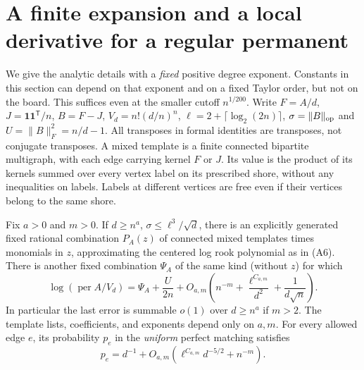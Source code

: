 \section{A finite expansion and a local derivative for a regular permanent}
\label{an:appendix}
We give the analytic details with a \emph{fixed} positive degree exponent. Constants in this section can depend on that exponent and on a fixed Taylor order, but not on the board. This suffices even at the smaller cutoff $n^{1/200}$. Write $F=A/d$, $J=\mathbf 1\mathbf 1^{\mathsf T}/n$, $B=F-J$, $V_d=n!(d/n)^n$, $\ell=2+\lceil\log_2(2n)\rceil$, $\sigma=\|B\|_{\rm op}$ and $U=\|B\|_F^2=n/d-1$. All transposes in formal identities are transposes, not conjugate transposes. A mixed template is a finite connected bipartite multigraph, with each edge carrying kernel $F$ or $J$. Its value is the product of its kernels summed over every vertex label on its prescribed shore, without any inequalities on labels. Labels at different vertices are free even if their vertices belong to the same shore.

\begin{proposition}\label{an:expansion}
Fix $a>0$ and $m>0$. If $d\ge n^a$, $\sigma\le\ell^3/\sqrt d$, there is an explicitly generated fixed rational combination $P_A(z)$ of connected mixed templates times monomials in $z$, approximating the centered log rook polynomial as in (A6). There is another fixed combination $\Psi_A$ of the same kind (without $z$) for which
\[
 \log(\operatorname{per} A/V_d)
 =\Psi_A+\frac{U}{2n}
 +O_{a,m}\left(n^{-m}+\frac{\ell^{C_{a,m}}}{d^2}
                           +\frac{1}{d\sqrt n}\right).
 \tag{A1}
\]
In particular the last error is summable $o(1)$ over $d\ge n^a$ if $m>2$. The template lists, coefficients, and exponents depend only on $a,m$. For every allowed edge $e$, its probability $p_e$ in the \emph{uniform} perfect matching satisfies
\[
       p_e=d^{-1}+O_{a,m}(\ell^{C_{a,m}}d^{-5/2}+n^{-m}).
       \tag{A2}
\]
\end{proposition}

